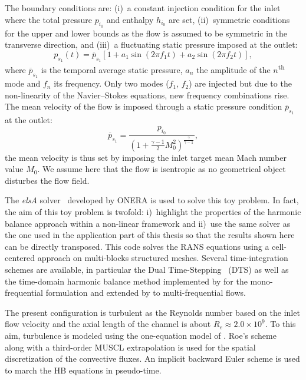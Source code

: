 The boundary conditions are: (i)~a constant injection condition for the inlet
where the total pressure $p_{i_0}$ and enthalpy $h_{i_0}$ are set,
(ii)~symmetric conditions for the upper and lower bounds as the flow
is assumed to be symmetric in the transverse direction, and (iii)~a
fluctuating static pressure imposed at the outlet:
\begin{equation}
  p_{s_1}(t) = \overline{p}_{s_1} \left[1 + a_1 \sin(2 \pi f_1 t) +
    a_2 \sin(2 \pi f_2 t) \right],
  \label{eq:outlet_canal}
\end{equation}
where $\overline{p}_{s_1}$ is the temporal average static pressure, $a_n$ the
amplitude of the $n$\textsuperscript{th} mode and $f_n$ its
frequency. Only two modes ($f_1$, $f_2$) are injected
but due to the non-linearity of the Navier--Stokes equations,
new frequency combinations rise.
The mean velocity of the flow is imposed through a
static pressure condition $\overline{p}_{s_1}$ at the outlet:
\begin{equation}
    \overline{p}_{s_1} = \frac{p_{i_0}}{\left(1 + 
    \frac{\gamma - 1}{2} M_{0}^2 \right) ^ {\frac{\gamma}{ \gamma - 1}}} ,
\end{equation}
the mean velocity is thus set by imposing the
inlet target mean Mach number value $M_{0}$.
We assume here that the flow is isentropic as no
geometrical object disturbes the flow field.

The \emph{elsA} solver~\cite{Cambier2013} developed by ONERA
is used to solve this toy problem. In fact, 
the aim of this toy problem is 
twofold: i)~highlight the properties of the harmonic balance
approach within a non-linear framework 
and ii)~use the same
solver as the one used in the application part of this
thesis so that the results shown here can be directly
transposed. 
This code solves the RANS equations using a cell-centered
approach on multi-blocks structured meshes.
Several time-integration schemes
are available, in particular the Dual Time-Stepping~\cite{Jameson1981} (DTS)
as well as the time-domain harmonic 
balance method implemented by \citet{JSicot2008} for the mono-frequential
formulation and extended by \citet{JGuedeney2013} to multi-frequential flows. 


The present configuration is turbulent as the Reynolds number based on the
inlet flow velocity and the axial length of the channel is about $R_e
\approx 2.0 \times 10^9$. To this aim, turbulence is modeled using the
one-equation model of \citet{Spalart1992}.
Roe's scheme~\cite{Roe1981} along with a third-order MUSCL extrapolation 
is used for the spatial discretization of
the convective fluxes. An implicit backward Euler scheme is used
to march the HB equations in pseudo-time.

